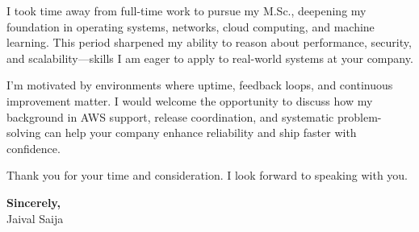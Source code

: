 \documentclass[11pt,a4paper]{article}
\begin{document}
I took time away from full-time work to pursue my M.Sc., deepening my foundation in operating systems, networks, cloud computing, and machine learning. This period sharpened my ability to reason about performance, security, and scalability—skills I am eager to apply to real-world systems at your company.

I'm motivated by environments where uptime, feedback loops, and continuous improvement matter. I would welcome the opportunity to discuss how my background in AWS support, release coordination, and systematic problem-solving can help your company enhance reliability and ship faster with confidence.

Thank you for your time and consideration. I look forward to speaking with you.

\textbf{Sincerely,} \\
Jaival Saija
\end{document}
